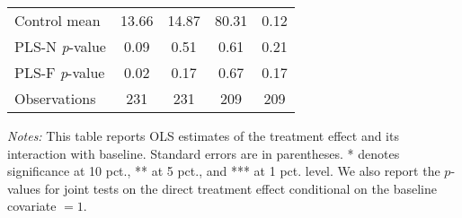\begin{table}[ht]
{\begin{threeparttable}
\begin{tabular}{l*{4}{c}}
Control mean    &    13.66         &    14.87         &    80.31         &     0.12         \\
PLS-N \emph{p}-value&     0.09         &     0.51         &     0.61         &     0.21         \\
PLS-F \emph{p}-value&     0.02         &     0.17         &     0.67         &     0.17         \\
Observations    &      231         &      231         &      209         &      209         \\
\bottomrule \end{tabular} \begin{tablenotes}[flushleft] \footnotesize \item \emph{Notes:} This table reports OLS estimates of the treatment effect and its interaction with baseline. Standard errors are in parentheses. * denotes significance at 10 pct., ** at 5 pct., and *** at 1 pct. level. We also report the \(p\)-values for joint tests on the direct treatment effect conditional on the baseline covariate $= 1$. \end{tablenotes} \end{threeparttable} } \end{table}

